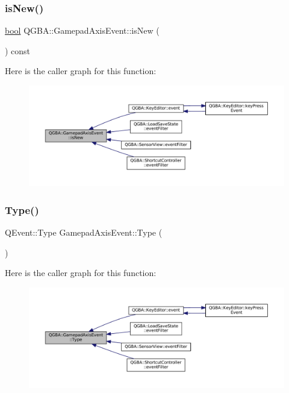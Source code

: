 \subsubsection{\texorpdfstring{is\+New()}{isNew()}}
{\footnotesize\ttfamily \mbox{\hyperlink{libretro_8h_a4a26dcae73fb7e1528214a068aca317e}{bool}} Q\+G\+B\+A\+::\+Gamepad\+Axis\+Event\+::is\+New (\begin{DoxyParamCaption}{ }\end{DoxyParamCaption}) const\hspace{0.3cm}{\ttfamily [inline]}}

Here is the caller graph for this function\+:
\nopagebreak
\begin{figure}[H]
\begin{center}
\leavevmode
\includegraphics[width=350pt]{class_q_g_b_a_1_1_gamepad_axis_event_ab9500aceac79b152a5e6a3ee90922f6b_icgraph}
\end{center}
\end{figure}
\mbox{\label{class_q_g_b_a_1_1_gamepad_axis_event_acd745058d3f98c37837432bf01067c16}} 
\subsubsection{\texorpdfstring{Type()}{Type()}}
{\footnotesize\ttfamily Q\+Event\+::\+Type Gamepad\+Axis\+Event\+::\+Type (\begin{DoxyParamCaption}{ }\end{DoxyParamCaption})\hspace{0.3cm}{\ttfamily [static]}}

Here is the caller graph for this function\+:
\nopagebreak
\begin{figure}[H]
\begin{center}
\leavevmode
\includegraphics[width=350pt]{class_q_g_b_a_1_1_gamepad_axis_event_acd745058d3f98c37837432bf01067c16_icgraph}
\end{center}
\end{figure}


